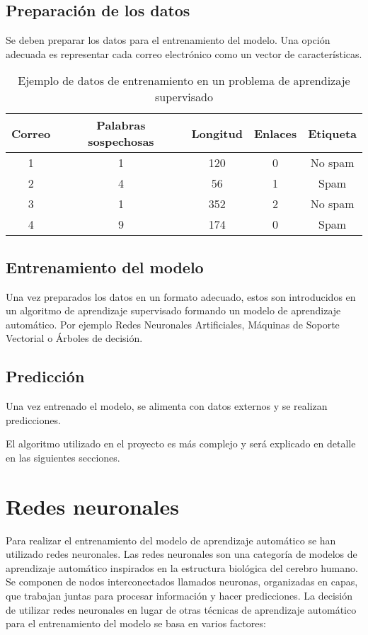\subsection{Preparación de los datos}
Se deben preparar los datos para el entrenamiento del modelo. 
Una opción adecuada es representar cada correo electrónico como un vector de características.

\begin{table}[ht]
\centering
\begin{tabular}{|c|c|c|c|c|}
\hline
\textbf{Correo} & \textbf{Palabras sospechosas} & \textbf{Longitud} & \textbf{Enlaces} & \textbf{Etiqueta} \\ \hline
1 & 1 & 120 & 0 & No spam \\
2 & 4 & 56 & 1 & Spam \\
3 & 1 & 352 & 2 & No spam \\
4 & 9 & 174 & 0 & Spam \\
\hline
\end{tabular}
\caption{Ejemplo de datos de entrenamiento en un problema de aprendizaje supervisado}
\end{table}

\subsection{Entrenamiento del modelo}
Una vez preparados los datos en un formato adecuado, estos son introducidos en un algoritmo de aprendizaje supervisado formando un modelo de aprendizaje automático. Por ejemplo Redes Neuronales Artificiales, Máquinas de Soporte Vectorial o Árboles de decisión.

\subsection{Predicción}
Una vez entrenado el modelo, se alimenta con datos externos y se realizan predicciones.

El algoritmo utilizado en el proyecto es más complejo y será explicado en detalle en las siguientes secciones.

\newpage

\section{Redes neuronales}
Para realizar el entrenamiento del modelo de aprendizaje automático se han utilizado redes neuronales. 
Las redes neuronales son una categoría de modelos de aprendizaje automático inspirados en la estructura biológica del cerebro humano. Se componen de nodos interconectados llamados neuronas, organizadas en capas, que trabajan juntas para procesar información y hacer predicciones.
La decisión de utilizar redes neuronales en lugar de otras técnicas de aprendizaje automático para el entrenamiento del modelo se basa en varios factores: \cite{9165253} \cite{Nandi_2021} 


